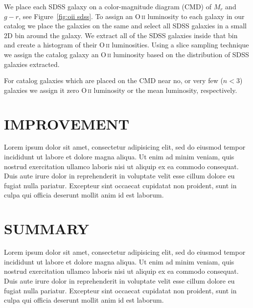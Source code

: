 \documentclass[apj, revtex4]{emulateapj}
\makeatletter
\DeclareRobustCommand{\ion}[2]{%
\relax\ifmmode
\ifx\testbx\f@series
{\mathbf{#1\,\mathsc{#2}}}\else
{\mathrm{#1\,\mathsc{#2}}}\fi
\else\textup{#1\,{\mdseries\textsc{#2}}}%
\fi}
\makeatother
\begin{document}
We place each SDSS galaxy on a color-magnitude diagram (CMD) of $M_r$ and $g-r$, see Figure~\ref{fig:oii sdss}. To assign an \ion{O}{ii} luminosity to each galaxy in our catalog we place the galaxies on the same and select all SDSS galaxies in a small 2D bin around the galaxy. We extract all of the SDSS galaxies inside that bin and create a histogram of their \ion{O}{ii} luminosities. Using a slice sampling technique we assign the catalog galaxy an \ion{O}{ii} luminosity based on the distribution of SDSS galaxies extracted.

For catalog galaxies which are placed on the CMD near no, or very few ($n<3$) galaxies we assign it zero \ion{O}{ii} luminosity or the mean luminosity, respectively.

\section{IMPROVEMENT}
Lorem ipsum dolor sit amet, consectetur adipisicing elit, sed do eiusmod tempor incididunt ut labore et dolore magna aliqua. Ut enim ad minim veniam, quis nostrud exercitation ullamco laboris nisi ut aliquip ex ea commodo consequat. Duis aute irure dolor in reprehenderit in voluptate velit esse cillum dolore eu fugiat nulla pariatur. Excepteur sint occaecat cupidatat non proident, sunt in culpa qui officia deserunt mollit anim id est laborum.
\section{SUMMARY}
Lorem ipsum dolor sit amet, consectetur adipisicing elit, sed do eiusmod tempor incididunt ut labore et dolore magna aliqua. Ut enim ad minim veniam, quis nostrud exercitation ullamco laboris nisi ut aliquip ex ea commodo consequat. Duis aute irure dolor in reprehenderit in voluptate velit esse cillum dolore eu fugiat nulla pariatur. Excepteur sint occaecat cupidatat non proident, sunt in culpa qui officia deserunt mollit anim id est laborum.

\end{document}
